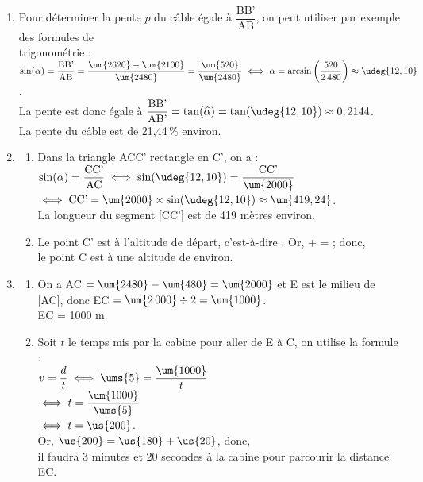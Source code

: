 \begin{corrige}
\ \\ [-5mm]
   \begin{enumerate}
      \item Pour déterminer la pente $p$ du câble égale à $\dfrac{\text{BB'}}{\text{AB}}$, on peut utiliser par exemple des formules de \\ [1mm]
         trigonométrie : $\sin(\alpha) =\dfrac{\text{BB'}}{\text{AB}} =\dfrac{\um{2620}-\um{2100}}{\um{2480}} =\dfrac{\um{520}}{\um{2480}} \iff \alpha =\arcsin\left(\dfrac{520}{2\,480}\right) \approx\udeg{12,10}$. \\ [1mm]
         La pente est donc égale à $\dfrac{\text{BB'}}{\text{AB'}} =\tan(\widehat{\alpha}) =\tan(\udeg{12,10}) \approx0,2144$. \\ [1mm]
         {\blue La pente du câble est de 21,44\,\% environ}.
      \item 
      \begin{enumerate}
         \item Dans la triangle ACC' rectangle en C', on a : $\sin(\alpha) =\dfrac{\text{CC'}}{\text{AC}} \iff \sin(\udeg{12,10}) =\dfrac{\text{CC'}}{\um{2000}}$ \\ [1mm]
         $\iff \text{CC'} =\um{2000}\times\sin(\udeg{12,10}) \approx\um{419,24}$. \\
         {\blue La longueur du segment [CC'] est de 419 mètres environ}.
         \item Le point C' est à l'altitude de départ, c'est-à-dire . Or,  +  =  ; donc, \\
         {\blue le point C est à une altitude de  environ.}
      \end{enumerate}
      \setcounter{enumi}{2}
      \item
      \begin{enumerate}
         \item On a AC $=\um{2480}-\um{480} =\um{2000}$ et E est le milieu de [AC], donc EC $=\um{2\,000}\div2 =\um{1000}$. \\
         {\blue EC = 1000 m.}
         \item Soit $t$ le temps mis par la cabine pour aller de E à C, on utilise la formule : \\ [1mm]
         $v =\dfrac{d}{t} \iff \ums{5} =\dfrac{\um{1000}}{t}$ \\
         \hspace*{0.9cm} $\iff t = \dfrac{\um{1000}}{\ums{5}}$ \\ [1.5mm]
         \hspace*{0.9cm} $\iff t  =\us{200}$. \\
         Or, $\us{200} =\us{180}+\us{20}$, donc, \\ 
         {\blue il faudra 3 minutes et 20 secondes à la cabine pour parcourir la distance EC}.
      \end{enumerate}
   \end{enumerate}
\end{corrige}

